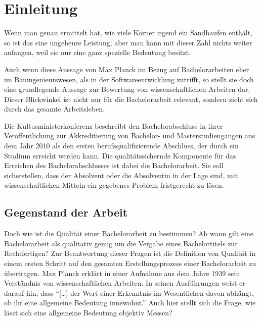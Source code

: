 
\chapter{Einleitung}
\begin{displayquote}
    Wenn man genau ermittelt hat, wie viele Körner irgend ein Sandhaufen enthält, so ist das eine ungeheure Leistung; aber man kann mit dieser Zahl nichts weiter anfangen, weil sie nur eine ganz spezielle Bedeutung besitzt.
\end{displayquote}

Auch wenn diese Aussage von Max Planck im Bezug auf Bachelorarbeiten eher im Bauingenieurswesen, als in der Softwareentwicklung zutrifft, so stellt sie doch eine grundlegende Aussage zur Bewertung von wissenschaftlichen Arbeiten dar. Dieser Blickwinkel ist nicht nur für die Bachelorarbeit relevant, sondern zieht sich durch das gesamte Arbeitsleben. 

Die Kultusministerkonferenz beschreibt den Bachelorabschluss in ihrer Veröffentlichung zur Akkreditierung von Bachelor- und Masterstudiengängen aus dem Jahr 2010 als den ersten berufsqualifizierende Abschluss, der durch ein Studium erreicht werden kann. Die qualitätssichernde Komponente für das Erreichen des Bachelorabschlusses ist dabei die Bachelorarbeit. Sie soll sicherstellen, dass der Absolvent oder die Absolventin in der Lage sind, mit wissenschaftlichen Mitteln ein gegebenes Problem fristgerecht zu lösen.\cite[Vgl.][S.4]{kmk:2010}



\section{Gegenstand der Arbeit}
Doch wie ist die Qualität einer Bachelorarbeit zu bestimmen? Ab wann gilt eine Bachelorarbeit als qualitativ genug um die Vergabe eines Bachelortitels zur Rechtfertigen? Zur Beantwortung dieser Fragen ist die Definition von Qualität in einem ersten Schritt auf den gesamten Erstellungsprozess einer Bachelorarbeit zu übertragen. 
Max Planck erklärt in einer Aufnahme aus dem Jahre 1939 sein Verständnis von wissenschaftlichen Arbeiten.
In seinen Ausführungen weist er darauf hin, dass \enquote{[…] der Wert einer Erkenntnis im Wesentlichen davon abhängt, ob ihr eine allgemeine Bedeutung innewohnt.}\cite{Herneck:1976}
Auch hier stellt sich die Frage, wie lässt sich eine allgemeine Bedeutung objektiv Messen? 

